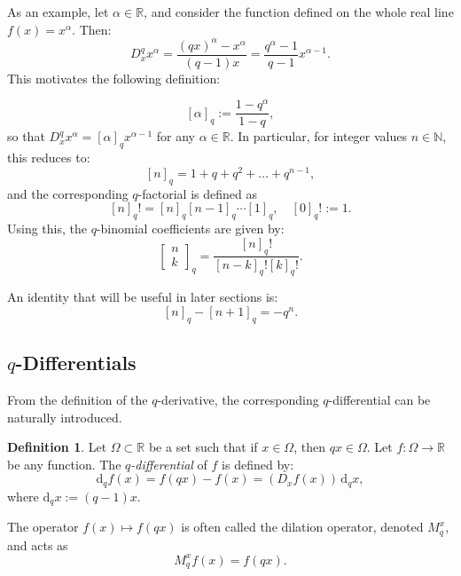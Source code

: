 \documentclass[10pt]{amsart}
\theoremstyle{plain}
\theoremstyle{definition}
\newtheorem{definition}[theorem]{Definition}
\begin{document}
As an example, let $ \alpha \in \mathbb{R} $, and consider the function defined on the whole real line $ f(x) = x^{\alpha} $. Then:
\[
D_x^{q} x^{\alpha} = \frac{(qx)^{\alpha} - x^{\alpha}}{(q - 1)x} = \frac{q^{\alpha} - 1}{q - 1} x^{\alpha - 1}.
\]
This motivates the following definition:

\[
[\alpha]_q := \frac{1 - q^{\alpha}}{1 - q},
\]
so that $ D_x^{q} x^{\alpha} = [\alpha]_q x^{\alpha - 1} $ for any $ \alpha \in \mathbb{R} $. In particular, for integer values $ n \in \mathbb{N} $, this reduces to:
\[
[n]_q = 1 + q + q^2 + \dots + q^{n-1},
\]
and the corresponding $q$-factorial is defined as
\[
[n]_q! = [n]_q [n-1]_q \cdots [1]_q, \quad [0]_q! := 1.
\]
Using this, the $q$-binomial coefficients are given by:
\[
\left[\begin{matrix}n\\k\end{matrix}\right]_q = \frac{[n]_q!}{[n-k]_q! [k]_q!}.
\]

An identity that will be useful in later sections is:
\[
[n]_q - [n+1]_q = -q^n.
\]

\subsection*{$q$-Differentials}
From the definition of the $q$-derivative, the corresponding $q$-differential can be naturally introduced.

\begin{definition}
Let $\Omega \subset \mathbb{R}$ be a set such that if $ x \in \Omega $, then $ qx \in \Omega $. Let $ f : \Omega \to \mathbb{R} $ be any function. The \textit{$q$-differential} of $f$ is defined by:
\[
\mathrm{d}_q f(x) = f(qx) - f(x) = \left( D_x f(x) \right)\, \mathrm{d}_q x,
\]
where $ \mathrm{d}_q x := (q - 1)x $.
\end{definition}

The operator $ f(x) \mapsto f(qx) $ is often called the dilation operator, denoted $ M_q^x $, and acts as 
$$M_q^x f(x) = f(qx).$$
\end{document}
